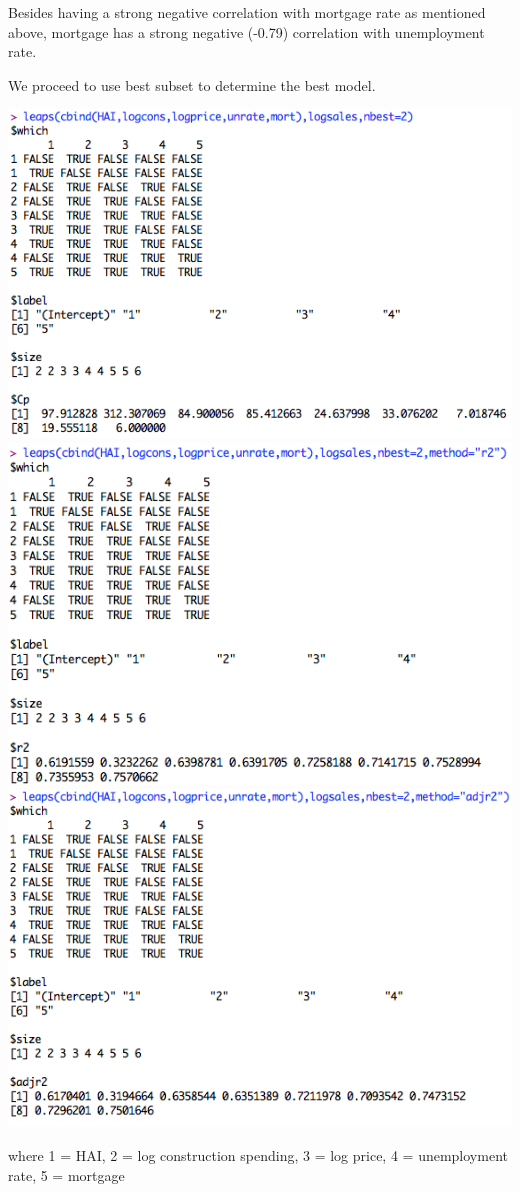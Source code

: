 \documentclass[a4 paper, 11 pt]{article}
\begin{document}
Besides having a strong negative correlation with mortgage rate as mentioned above, mortgage has a strong negative (-0.79) correlation with unemployment rate.

We proceed to use best subset to determine the best model.
\begin{center}
\includegraphics[scale=0.5]{best}
\includegraphics[scale=0.5]{r2}
\includegraphics[scale=0.5]{adjr2}
\end{center}
where 1 = HAI, 2 = log construction spending, 3 = log price, 4 = unemployment rate, 5 = mortgage
\end{document}
